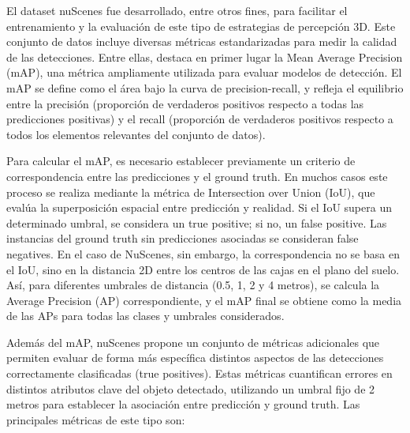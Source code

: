 El dataset nuScenes fue desarrollado, entre otros fines, para facilitar el entrenamiento y la evaluación de este tipo de estrategias de percepción 3D. Este conjunto de datos incluye diversas métricas estandarizadas para medir la calidad de las detecciones. Entre ellas, destaca en primer lugar la Mean Average Precision (mAP), una métrica ampliamente utilizada para evaluar modelos de detección. El mAP se define como el área bajo la curva de precision-recall, y refleja el equilibrio entre la precisión (proporción de verdaderos positivos respecto a todas las predicciones positivas) y el recall (proporción de verdaderos positivos respecto a todos los elementos relevantes del conjunto de datos).

Para calcular el mAP, es necesario establecer previamente un criterio de correspondencia entre las predicciones y el ground truth. En muchos casos este proceso se realiza mediante la métrica de Intersection over Union (IoU), que evalúa la superposición espacial entre predicción y realidad. Si el IoU supera un determinado umbral, se considera un true positive; si no, un false positive. Las instancias del ground truth sin predicciones asociadas se consideran false negatives. En el caso de NuScenes, sin embargo, la correspondencia no se basa en el IoU, sino en la distancia 2D entre los centros de las cajas en el plano del suelo. Así, para diferentes umbrales de distancia (0.5, 1, 2 y 4 metros), se calcula la Average Precision (AP) correspondiente, y el mAP final se obtiene como la media de las APs para todas las clases y umbrales considerados.

Además del mAP, nuScenes propone un conjunto de métricas adicionales que permiten evaluar de forma más específica distintos aspectos de las detecciones correctamente clasificadas (true positives). Estas métricas cuantifican errores en distintos atributos clave del objeto detectado, utilizando un umbral fijo de 2 metros para establecer la asociación entre predicción y ground truth. Las principales métricas de este tipo son:

